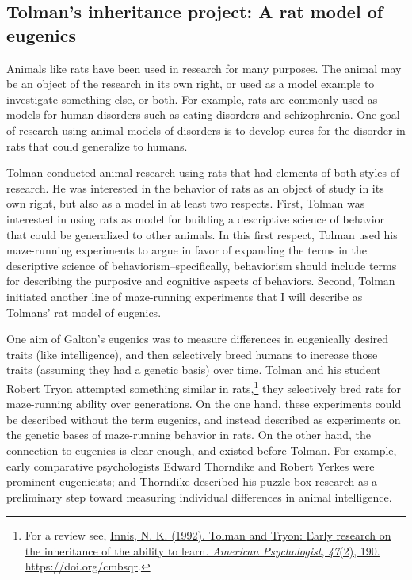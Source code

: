 \documentclass[
  oneside,
  12pt]{crumpbook}
\begin{document}
\hypertarget{tolmans-inheritance-project-a-rat-model-of-eugenics}{%
\subsection{Tolman's inheritance project: A rat model of eugenics}\label{tolmans-inheritance-project-a-rat-model-of-eugenics}}

Animals like rats have been used in research for many purposes. The animal may be an object of the research in its own right, or used as a model example to investigate something else, or both. For example, rats are commonly used as models for human disorders such as eating disorders and schizophrenia. One goal of research using animal models of disorders is to develop cures for the disorder in rats that could generalize to humans.

Tolman conducted animal research using rats that had elements of both styles of research. He was interested in the behavior of rats as an object of study in its own right, but also as a model in at least two respects. First, Tolman was interested in using rats as model for building a descriptive science of behavior that could be generalized to other animals. In this first respect, Tolman used his maze-running experiments to argue in favor of expanding the terms in the descriptive science of behaviorism--specifically, behaviorism should include terms for describing the purposive and cognitive aspects of behaviors. Second, Tolman initiated another line of maze-running experiments that I will describe as Tolmans' rat model of eugenics.

One aim of Galton's eugenics was to measure differences in eugenically desired traits (like intelligence), and then selectively breed humans to increase those traits (assuming they had a genetic basis) over time. Tolman and his student Robert Tryon attempted something similar in rats,\footnote{For a review see, \protect\hyperlink{ref-innisTolmanTryonEarly1992}{Innis, N. K. (1992). Tolman and {Tryon}: {Early} research on the inheritance of the ability to learn. \emph{American Psychologist}, \emph{47}(2), 190. \url{https://doi.org/cmbsqr}}.} they selectively bred rats for maze-running ability over generations. On the one hand, these experiments could be described without the term eugenics, and instead described as experiments on the genetic bases of maze-running behavior in rats. On the other hand, the connection to eugenics is clear enough, and existed before Tolman. For example, early comparative psychologists Edward Thorndike and Robert Yerkes were prominent eugenicists; and Thorndike described his puzzle box research as a preliminary step toward measuring individual differences in animal intelligence.
\end{document}
